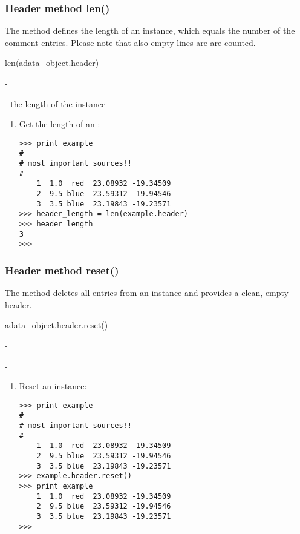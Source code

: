 \subsubsection{Header method len()}
\label{ahe_len}
%
The method defines the length of an \ah instance, which
equals the number of the comment entries. Please note that
also empty lines are are counted.

len(adata\_object.header)

-

- the length of the \ah instance

\begin{enumerate}
\item Get the length of an \ah:
\begin{small}
\begin{verbatim}
>>> print example
#
# most important sources!!
#
    1  1.0  red  23.08932 -19.34509
    2  9.5 blue  23.59312 -19.94546
    3  3.5 blue  23.19843 -19.23571
>>> header_length = len(example.header)
>>> header_length
3
>>>
\end{verbatim}
\end{small}
\end{enumerate}


\subsubsection{Header method reset()}
\label{ahe_res}
%
The method deletes all entries from an \ah instance and provides
a clean, empty header.

adata\_object.header.reset()

-

-

\begin{enumerate}
\item Reset an \ah instance:
\begin{small}
\begin{verbatim}
>>> print example
#
# most important sources!!
#
    1  1.0  red  23.08932 -19.34509
    2  9.5 blue  23.59312 -19.94546
    3  3.5 blue  23.19843 -19.23571
>>> example.header.reset()
>>> print example
    1  1.0  red  23.08932 -19.34509
    2  9.5 blue  23.59312 -19.94546
    3  3.5 blue  23.19843 -19.23571
>>>
\end{verbatim}
\end{small}
\end{enumerate}

